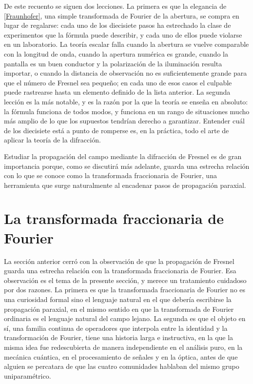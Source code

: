 De este recuento se siguen dos lecciones. La primera es que la elegancia de \eqref{Fraunhofer}, una simple transformada de Fourier de la abertura, se compra en lugar de regalarse: cada uno de los diecisiete pasos ha estrechado la clase de experimentos que la fórmula puede describir, y cada uno de ellos puede violarse en un laboratorio. La teoría escalar falla cuando la abertura se vuelve comparable con la longitud de onda, cuando la apertura numérica es grande, cuando la pantalla es un buen conductor y la polarización de la iluminación resulta importar, o cuando la distancia de observación no es suficientemente grande para que el número de Fresnel sea pequeño; en cada uno de esos casos el culpable puede rastrearse hasta un elemento definido de la lista anterior. La segunda lección es la más notable, y es la razón por la que la teoría se enseña en absoluto: la fórmula funciona de todos modos, y funciona en un rango de situaciones mucho más amplio de lo que los supuestos tendrían derecho a garantizar. Entender cuál de los diecisiete está a punto de romperse es, en la práctica, todo el arte de aplicar la teoría de la difracción.


Estudiar la propagación del campo mediante la difracción de Fresnel es de gran importancia porque, como se discutirá más adelante, guarda una estrecha relación con lo que se conoce como la transformada fraccionaria de Fourier, una herramienta que surge naturalmente al encadenar pasos de propagación paraxial.

\section{La transformada fraccionaria de Fourier}\label{sec:FrFT}

	La sección anterior cerró con la observación de que la propagación de Fresnel guarda una estrecha relación con la transformada fraccionaria de Fourier. Esa observación es el tema de la presente sección, y merece un tratamiento cuidadoso por dos razones. La primera es que la transformada fraccionaria de Fourier no es una curiosidad formal sino el lenguaje natural en el que debería escribirse la propagación paraxial, en el mismo sentido en que la transformada de Fourier ordinaria es el lenguaje natural del campo lejano. La segunda es que el objeto en sí, una familia continua de operadores que interpola entre la identidad y la transformación de Fourier, tiene una historia larga e instructiva, en la que la misma idea fue redescubierta de manera independiente en el análisis puro, en la mecánica cuántica, en el procesamiento de señales y en la óptica, antes de que alguien se percatara de que las cuatro comunidades hablaban del mismo grupo uniparamétrico.

